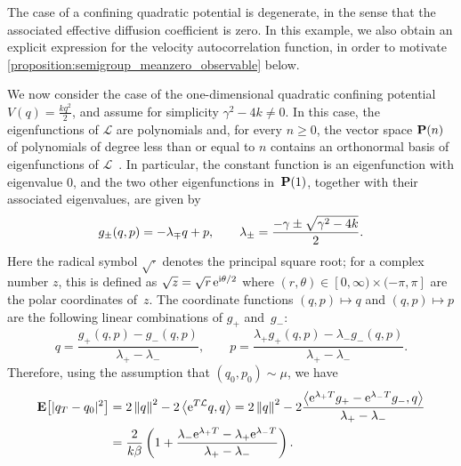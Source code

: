 \documentclass[11pt,a4paper]{article}
\begin{document}
The case of a confining quadratic potential is degenerate,
in the sense that the associated effective diffusion coefficient is zero.
In this example,
we also obtain an explicit expression for the velocity autocorrelation function,
in order to motivate \cref{proposition:semigroup_meanzero_observable} below.
\begin{example}
    \label{example:quadratic}
    We now consider the case of the one-dimensional quadratic confining potential $V(q) = \frac{k q^2}{2}$,
    and assume for simplicity $\gamma^2 - 4 k \neq 0$.
    In this case, the eigenfunctions of $\mathcal L$ are polynomials
    and, for every $n \geq 0$, the vector space $\mathbf P(n)$ of polynomials of degree less than or equal to $n$
    contains an orthonormal basis of eigenfunctions of $\mathcal L$~\cite[Section~6.3]{pavliotis2011applied}.
    In particular, the constant function is an eigenfunction with eigenvalue 0,
    and the two other eigenfunctions in~$\mathbf P(1)$, together with their associated eigenvalues,
    are given by
    \begin{equation*}
        g_{\pm}(q, p) =
        - \lambda_{\mp} q + p, \\
        \qquad
        \lambda_{\pm} = \frac{- \gamma \pm \sqrt{\gamma^2 - 4k}}{2}.
    \end{equation*}
    Here the radical symbol $\sqrt{\cdot}$ denotes the principal square root;
    for a complex number $z$, this is defined as $\sqrt{z} = \sqrt{r} \, \mathrm{e}^{\mathrm{i} \theta/2}$ where $(r, \theta) \in [0, \infty) \times (-\pi, \pi]$ are the polar coordinates of~$z$.
    The coordinate functions $(q, p) \mapsto q$ and $(q, p) \mapsto p$ are the following linear combinations of $g_+$ and~$g_-$:
    \[
        q = \frac{g_+(q,p) - g_-(q,p)}{\lambda_+ - \lambda_-},
        \qquad
        p = \frac{\lambda_+ g_+(q,p) - \lambda_- g_-(q,p)}{\lambda_+ - \lambda_-}.
    \]
    Therefore,
    using the assumption that $(q_0, p_0) \sim \mu$,
    we have
    \begin{align*}
        \expect \bigl[ \lvert q_T - q_0 \rvert^2 \bigr]
        &= 2 \norm{q}^2 - 2 \ip{\e^{T \mathcal L}q}{q}
        = 2 \norm{q}^2 - 2 \frac{\ip{\e^{\lambda_+ T} g_+ - \e^{\lambda_- T} g_-}{q}}{\lambda_+ - \lambda_-} \\
        &= \frac{2}{k \beta} \left( 1 +  \frac{\lambda_- \e^{\lambda_+ T} - \lambda_+ \e^{\lambda_- T}}{\lambda_+ - \lambda_-} \right).

\end{align*}
\end{example}
\end{document}
